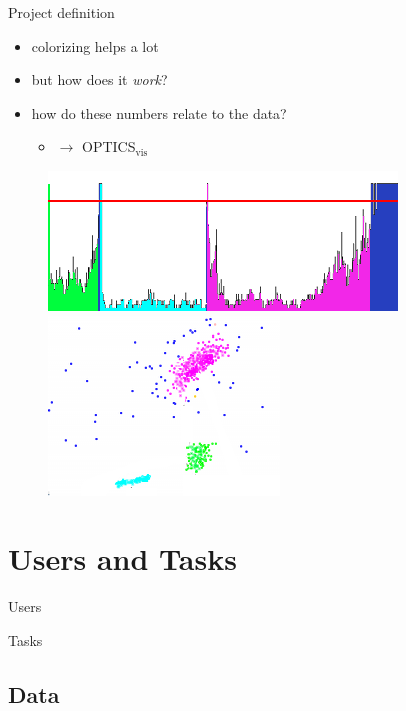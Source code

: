 \documentclass[naustrian]{beamer}
\begin{document}
\begin{frame}{Project definition}
    \begin{itemize}
        \item colorizing helps a lot
        \item but how does it \emph{work}?
        \item how do these numbers relate to the data?
            \begin{itemize}
                \item[] $\rightarrow$ OPTICS$_\text{vis}$
            \end{itemize}
    \end{itemize}
    \begin{figure}[h]
        \centering
        \includegraphics[height=.3\textheight]{img/optics-edited-color}
        \vspace{1em}
        \includegraphics[width=.3\textwidth]{img/optics-edited-points}
    \end{figure}
\end{frame}

\section{Users and Tasks}

\begin{frame}{Users}
\end{frame}

\begin{frame}{Tasks}
\end{frame}

\subsection{Data}
\end{document}

